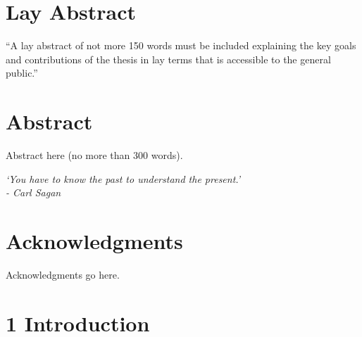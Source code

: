 \documentclass[
]{report}
\begin{document}
\chapter{Lay Abstract}
``A lay abstract of not more 150 words must be included explaining the
key goals and contributions of the thesis in lay terms that is
accessible to the general public.''

\chapter{Abstract}
Abstract here (no more than 300 words).

\newpage
\null\vfill
\begin{center}
\textsl{`You have to know the past to understand the present.' \\ - Carl
Sagan}
\end{center}
\vfill
	
\chapter{Acknowledgments}
Acknowledgments go here.
\newpage

\tableofcontents

\newpage
\addvspace{10pt}
\let\saveaddvspace=\addvspace
\def\addvspace#1{}
\listoffigures
\let\addvspace=\saveaddvspace

\newpage
\addvspace{10pt}
\let\saveaddvspace=\addvspace
\def\addvspace#1{}
\listoftables
\let\addvspace=\saveaddvspace
\label{NumPrefacePages}
\newpage

\hypersetup{pageanchor=true}


\hypertarget{introduction}{%
\chapter{1 Introduction}\label{introduction}}
\end{document}

